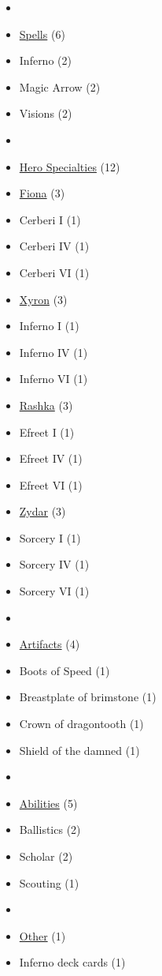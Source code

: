 \begin{multicols}{3}
\begin{itemize}[leftmargin=0pt, label={}, noitemsep, noitemsep]
  \item
  \item \underline{Spells} (6)
  \item Inferno (2)
  \item Magic Arrow (2)
  \item Visions (2)
  \item
  \item \underline{Hero Specialties} (12)
  \item \underline{Fiona} (3)
  \item Cerberi I (1)
  \item Cerberi IV (1)
  \item Cerberi VI (1)
  \item \underline{Xyron} (3)
  \item Inferno I (1)
  \item Inferno IV (1)
  \item Inferno VI (1)
  \item \underline{Rashka} (3)
  \item Efreet I (1)
  \item Efreet IV (1)
  \item Efreet VI (1)
  \item \underline{Zydar} (3)
  \item Sorcery I (1)
  \item Sorcery IV (1)
  \item Sorcery VI (1)
  \item
  \item \underline{Artifacts} (4)
  \item Boots of Speed (1)
  \item Breastplate of brimstone (1)
  \item Crown of dragontooth (1)
  \item Shield of the damned (1)
  \item
  \item \underline{Abilities} (5)
  \item Ballistics (2)
  \item Scholar (2)
  \item Scouting (1)
  \item
  \item \underline{Other} (1)
  \item Inferno deck cards (1)
\end{itemize}

\end{multicols}
